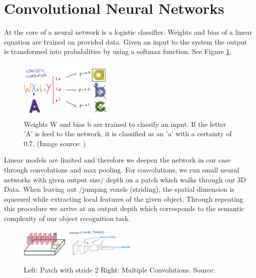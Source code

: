 \documentclass[10pt,twocolumn,letterpaper]{article}
\begin{document}
\section{Convolutional Neural Networks}

At the core of a neural network is a logistic classifier. 
Weights and bias of a linear equation are trained on provided data. Given an input to the system the output is
transformed into probabilities by using a softmax function. See Figure \ref{fig:classifier}.


\begin{figure}[h]
	\label{fig:classifier}
	\centering
	\includegraphics[width=0.4\textwidth]{figures/classifier}
	\caption{Weights W and bias b are trained to classify an input. If the letter 'A' is feed to the network, it is classified as an 'a' with a certainty of 0.7. (Image source: \cite{udacity})}
\end{figure}

Linear models are limited and therefore we deepen the network in our case through convolutions and max pooling.
For convolutions, we run small neural networks with given output size/ depth on a patch which walks through our 3D Data. When leaving out /jumping voxels (striding),
the spatial dimension is squeezed while extracting local features of the given object. 
Through repeating this procedure we arrive at an output depth which corresponds to the semantic complexity of our object recognition task. 

\begin{figure}[h]
	\label{fig:convolution}
	\includegraphics[width=0.2\textwidth]{figures/conv}
	\includegraphics[width=0.3\textwidth]{figures/pyra}
	\caption{Left: Patch with stride 2 \quad Right: Multiple Convolutions. Source: \cite{udacity}}
\end{figure}
\end{document}
